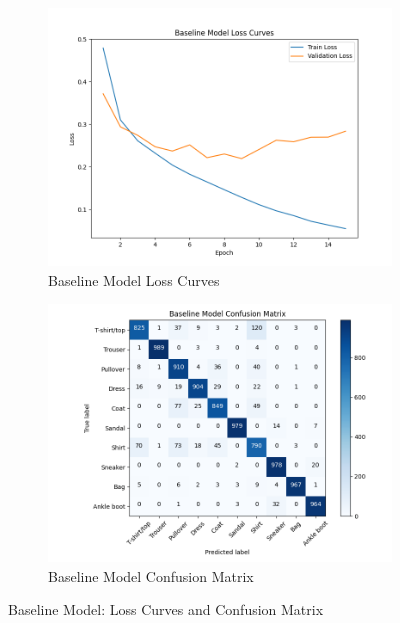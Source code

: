 \documentclass[letterpaper]{article}
\begin{document}
	\begin{figure}[H]
		\centering
		\begin{subfigure}{0.49\linewidth}
			\centering
			\includegraphics[width=\linewidth]{baseline_loss_curves.png}
			\caption{Baseline Model Loss Curves}
			\label{fig:baseline_loss}
		\end{subfigure}
		\hfill
		\begin{subfigure}{0.49\linewidth}
			\centering
			\includegraphics[width=\linewidth]{baseline_confusion_matrix.png}
			\caption{Baseline Model Confusion Matrix}
			\label{fig:baseline_conf_mat}
		\end{subfigure}
		\caption{Baseline Model: Loss Curves and Confusion Matrix}
		\label{fig:baseline_sidebyside}
	\end{figure}
	
\end{document}
